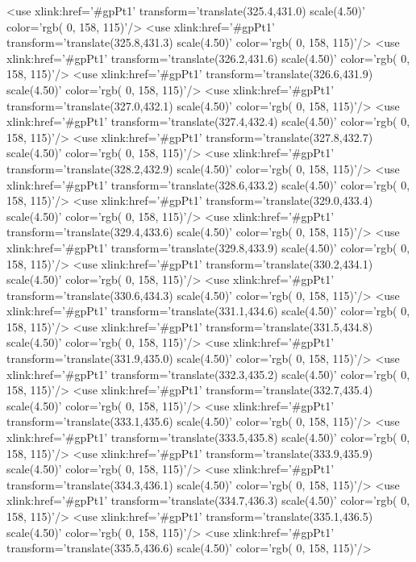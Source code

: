 	<use xlink:href='#gpPt1' transform='translate(325.4,431.0) scale(4.50)' color='rgb(  0, 158, 115)'/>
	<use xlink:href='#gpPt1' transform='translate(325.8,431.3) scale(4.50)' color='rgb(  0, 158, 115)'/>
	<use xlink:href='#gpPt1' transform='translate(326.2,431.6) scale(4.50)' color='rgb(  0, 158, 115)'/>
	<use xlink:href='#gpPt1' transform='translate(326.6,431.9) scale(4.50)' color='rgb(  0, 158, 115)'/>
	<use xlink:href='#gpPt1' transform='translate(327.0,432.1) scale(4.50)' color='rgb(  0, 158, 115)'/>
	<use xlink:href='#gpPt1' transform='translate(327.4,432.4) scale(4.50)' color='rgb(  0, 158, 115)'/>
	<use xlink:href='#gpPt1' transform='translate(327.8,432.7) scale(4.50)' color='rgb(  0, 158, 115)'/>
	<use xlink:href='#gpPt1' transform='translate(328.2,432.9) scale(4.50)' color='rgb(  0, 158, 115)'/>
	<use xlink:href='#gpPt1' transform='translate(328.6,433.2) scale(4.50)' color='rgb(  0, 158, 115)'/>
	<use xlink:href='#gpPt1' transform='translate(329.0,433.4) scale(4.50)' color='rgb(  0, 158, 115)'/>
	<use xlink:href='#gpPt1' transform='translate(329.4,433.6) scale(4.50)' color='rgb(  0, 158, 115)'/>
	<use xlink:href='#gpPt1' transform='translate(329.8,433.9) scale(4.50)' color='rgb(  0, 158, 115)'/>
	<use xlink:href='#gpPt1' transform='translate(330.2,434.1) scale(4.50)' color='rgb(  0, 158, 115)'/>
	<use xlink:href='#gpPt1' transform='translate(330.6,434.3) scale(4.50)' color='rgb(  0, 158, 115)'/>
	<use xlink:href='#gpPt1' transform='translate(331.1,434.6) scale(4.50)' color='rgb(  0, 158, 115)'/>
	<use xlink:href='#gpPt1' transform='translate(331.5,434.8) scale(4.50)' color='rgb(  0, 158, 115)'/>
	<use xlink:href='#gpPt1' transform='translate(331.9,435.0) scale(4.50)' color='rgb(  0, 158, 115)'/>
	<use xlink:href='#gpPt1' transform='translate(332.3,435.2) scale(4.50)' color='rgb(  0, 158, 115)'/>
	<use xlink:href='#gpPt1' transform='translate(332.7,435.4) scale(4.50)' color='rgb(  0, 158, 115)'/>
	<use xlink:href='#gpPt1' transform='translate(333.1,435.6) scale(4.50)' color='rgb(  0, 158, 115)'/>
	<use xlink:href='#gpPt1' transform='translate(333.5,435.8) scale(4.50)' color='rgb(  0, 158, 115)'/>
	<use xlink:href='#gpPt1' transform='translate(333.9,435.9) scale(4.50)' color='rgb(  0, 158, 115)'/>
	<use xlink:href='#gpPt1' transform='translate(334.3,436.1) scale(4.50)' color='rgb(  0, 158, 115)'/>
	<use xlink:href='#gpPt1' transform='translate(334.7,436.3) scale(4.50)' color='rgb(  0, 158, 115)'/>
	<use xlink:href='#gpPt1' transform='translate(335.1,436.5) scale(4.50)' color='rgb(  0, 158, 115)'/>
	<use xlink:href='#gpPt1' transform='translate(335.5,436.6) scale(4.50)' color='rgb(  0, 158, 115)'/>
